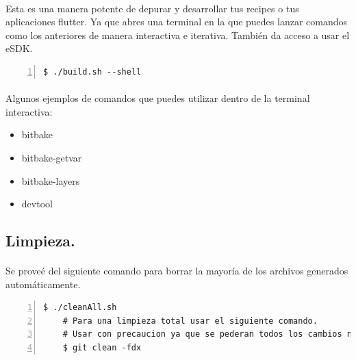 \paragraph{}Esta es una manera potente de depurar y desarrollar tus recipes o tus
aplicaciones flutter. Ya que abres una terminal en la que puedes lanzar comandos como
los anteriores de manera interactiva e iterativa. También da acceso a usar el \gls{eSDK}.

\begin{lstlisting}[style=consola, numbers=left]
    $ ./build.sh --shell
\end{lstlisting}

\paragraph{}Algunos ejemplos de comandos que puedes utilizar dentro de la terminal interactiva:

\begin{itemize}
    \item bitbake
    \item bitbake-getvar
    \item bitbake-layers
    \item devtool
\end{itemize}

\subsection{Limpieza.}

\paragraph{}Se proveé del siguiente comando para borrar la mayoría de los archivos generados
automáticamente.

\begin{lstlisting}[style=consola, numbers=left]
    $ ./cleanAll.sh
    # Para una limpieza total usar el siguiente comando.
    # Usar con precaucion ya que se pederan todos los cambios no guardados en git.
    $ git clean -fdx
\end{lstlisting}


